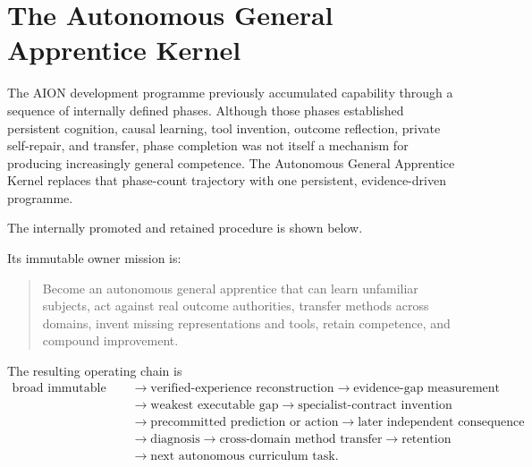 
\section{The Autonomous General Apprentice Kernel}
\label{sec:aion-autonomous-general-apprentice}

The AION development programme previously accumulated capability through a
sequence of internally defined phases.  Although those phases established
persistent cognition, causal learning, tool invention, outcome reflection,
private self-repair, and transfer, phase completion was not itself a mechanism
for producing increasingly general competence.  The Autonomous General
Apprentice Kernel replaces that phase-count trajectory with one persistent,
evidence-driven programme.

The internally promoted and retained procedure is shown below.
\begin{center}
\small{}
\end{center}
Its immutable owner mission is:

\begin{quote}
Become an autonomous general apprentice that can learn unfamiliar subjects,
act against real outcome authorities, transfer methods across domains, invent
missing representations and tools, retain competence, and compound
improvement.
\end{quote}

The resulting operating chain is
\begin{equation}
\begin{aligned}
\text{broad immutable mission}
&\rightarrow \text{verified-experience reconstruction}
\rightarrow \text{evidence-gap measurement} \\
&\rightarrow \text{weakest executable gap}
\rightarrow \text{specialist-contract invention} \\
&\rightarrow \text{precommitted prediction or action}
\rightarrow \text{later independent consequence} \\
&\rightarrow \text{diagnosis}
\rightarrow \text{cross-domain method transfer}
\rightarrow \text{retention} \\
&\rightarrow \text{next autonomous curriculum task}.
\end{aligned}
\label{eq:general-apprentice-loop}
\end{equation}

